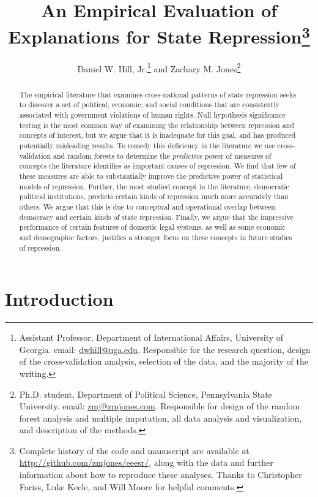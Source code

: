 \documentclass[11pt]{article}
\date{}
\title{An Empirical Evaluation of Explanations for State Repression\thanks{Complete history of the code and manuscript are available at \url{http://github.com/zmjones/eeesr/}, along with the data and further information about how to reproduce these analyses. Thanks to Christopher Fariss, Luke Keele, and Will Moore for helpful comments.}}
\author{Daniel W. Hill, Jr.\thanks{Assistant Professor, Department of International Affairs,
University of Georgia. email: \href{mailto:dwhill@uga.edu}{dwhill@uga.edu}. Responsible for the research question, design of the cross-validation analysis, selection of the data, and the majority of the writing.} and Zachary M. Jones\thanks{Ph.D. student, Department of Political Science, Pennsylvania State University. email: \href{mailto:zmj@zmjones.com}{zmj@zmjones.com}. Responsible for design of the random forest analysis and multiple imputation, all data analysis and visualization, and description of the methods.}}
\begin{document}
\vspace{50mm}
\bigskip
\maketitle 
\thispagestyle{empty}

\begin{abstract}
The empirical literature that examines cross-national patterns of state repression seeks to discover a set of political, economic, and social conditions that are consistently associated with government violations of human rights. Null hypothesis significance testing is the most common way of examining the relationship  between repression and concepts of interest, but we argue that it is inadequate for this goal, and has produced potentially misleading results. To remedy this deficiency in the literature we use cross-validation and random forests to determine the {\em predictive} power of measures of concepts the literature identifies as important causes of repression. We find that few of these measures are able to substantially improve the predictive power of statistical models of repression. Further, the most studied concept in the literature, democratic political institutions, predicts certain kinds of repression much more accurately than others. We argue that this is due to conceptual and operational overlap between democracy and certain kinds of state repression. Finally, we argue that the impressive performance of certain features of domestic legal systems, as well as some economic and demographic factors, justifies a stronger focus on these concepts in future studies of repression.
\end{abstract}

\section*{Introduction}
\end{document}
